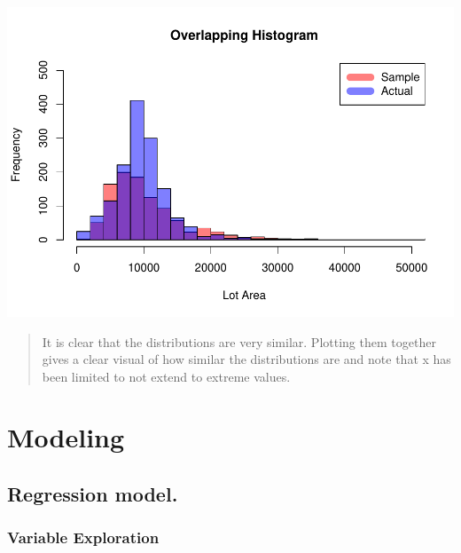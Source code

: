 \documentclass[]{article}
\newenvironment{Shaded}{\begin{snugshade}}{\end{snugshade}}
\newcommand{\KeywordTok}[1]{\textcolor[rgb]{0.13,0.29,0.53}{\textbf{{#1}}}}
\newcommand{\DataTypeTok}[1]{\textcolor[rgb]{0.13,0.29,0.53}{{#1}}}
\newcommand{\StringTok}[1]{\textcolor[rgb]{0.31,0.60,0.02}{{#1}}}
\newcommand{\NormalTok}[1]{{#1}}
\begin{document}
\includegraphics{Final_Project_files/figure-latex/unnamed-chunk-18-1.pdf}

\begin{quote}
It is clear that the distributions are very similar. Plotting them
together gives a clear visual of how similar the distributions are and
note that x has been limited to not extend to extreme values.
\end{quote}

\newpage

\section{Modeling}\label{modeling}

\subsection{Regression model.}\label{regression-model.}

\subsubsection{Variable Exploration}\label{variable-exploration}

\begin{Shaded}
\end{Shaded}
\end{document}
